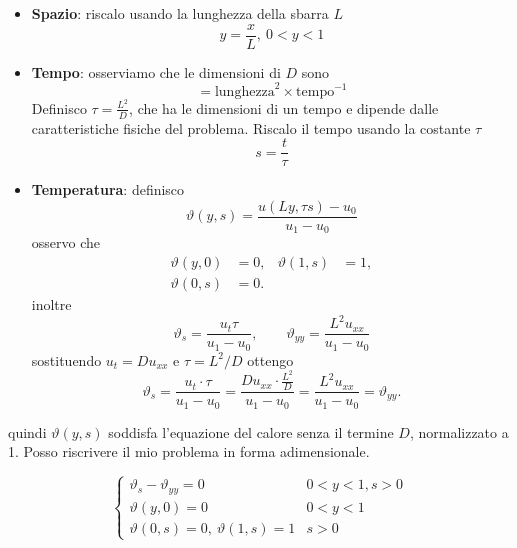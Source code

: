 \documentclass[10pt,a4paper,twoside,openright]{book}
\begin{document}
\begin{itemize}
\item \textbf{Spazio}: riscalo usando la lunghezza della sbarra $\displaystyle L$
\begin{equation*}
y=\frac{x}{L},\ 0< y< 1
\end{equation*}
\item \textbf{Tempo}: osserviamo che le dimensioni di $\displaystyle D$ sono
\begin{equation*}
[D] =\text{lunghezza}^{2} \times \text{tempo}^{-1}
\end{equation*}
Definisco $\displaystyle \tau =\frac{L^{2}}{D}$, che ha le dimensioni di un tempo e dipende dalle caratteristiche fisiche del problema. Riscalo il tempo usando la costante $\tau$
\begin{equation*}
	s=\frac{t}{\tau}
\end{equation*}
\item \textbf{Temperatura}: definisco
\begin{equation*}
\vartheta (y,s) =\frac{u(Ly,\tau s) -u_{0}}{u_{1} -u_{0}}
\end{equation*}
osservo che
\begin{align*}
\vartheta ( y,0) & =0, & \vartheta ( 1,s) & =1,\\
\vartheta ( 0,s) & =0. &  & 
\end{align*}
inoltre
\begin{equation*}
\vartheta _{s} =\frac{u_{t} \tau }{u_{1} -u_{0}} ,\qquad \vartheta _{yy} =\frac{L^{2} u_{xx}}{u_{1} -u_{0}}
\end{equation*}
sostituendo $u_{t} =Du_{xx}$ e $\tau =L^{2} /D$ ottengo\begin{equation*}
\vartheta _{s} =\frac{u_{t} \cdotp \tau }{u_{1} -u_{0}} =\frac{Du_{xx} \cdotp \frac{L^{2}}{D}}{u_{1} -u_{0}} =\frac{L^{2} u_{xx}}{u_{1} -u_{0}} =\vartheta _{yy} .
\end{equation*}
\end{itemize}
quindi $\vartheta(y,s)$ soddisfa l'equazione del calore senza il termine $D$, normalizzato a 1. Posso riscrivere il mio problema in forma adimensionale.

\begin{equation*}
\begin{cases}
\vartheta_{s} -\vartheta_{yy} =0 & 0< y< 1,s >0\\
\vartheta(y,0) =0 & 0< y< 1\\
\vartheta(0,s) =0,\ \vartheta(1,s) =1 & s >0
\end{cases}
\end{equation*}
\end{document}
